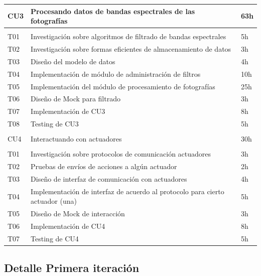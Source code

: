 \begin{table}[h!]
    \begin{tabular}{lll}
	\hline
	CU3 & Procesando datos de bandas espectrales de las fotografías & 63h \\
	\hline \\
	T01 & Investigación sobre algoritmos de filtrado de bandas espectrales & 5h \\
	T02 & Investigación sobre formas eficientes de almacenamiento de datos & 3h \\
	T03 & Diseño del modelo de datos & 4h \\
	T04 & Implementación de módulo de administración de filtros & 10h \\
	T05 & Implementación del módulo de procesamiento de fotografías & 25h \\
	T06 & Diseño de Mock para filtrado & 3h \\
	T07 & Implementación de CU3 & 8h \\
	T08 & Testing de CU3 & 5h \\
	\hline \\
	\hline
	CU4 & Interactuando con actuadores & 30h \\
	\hline \\
	T01 & Investigación sobre protocolos de comunicación actuadores & 3h \\
	T02 & Pruebas de envíos de acciones a algún actuador & 2h \\
	T03 & Diseño de interfaz de comunicación con actuadores & 4h \\
	T04 & Implementación de interfaz de acuerdo al protocolo para cierto actuador (una) & 5h \\
	T05 & Diseño de Mock de interacción & 3h \\
	T06 & Implementación de CU4 & 8h \\
	T07 & Testing de CU4 & 5h \\
	\hline
    \end{tabular}
\end{table}

\subsection{Detalle Primera iteración}

